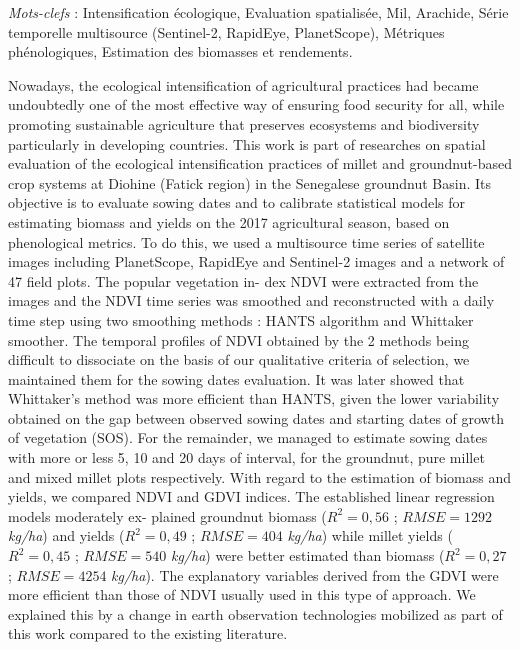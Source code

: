 \documentclass[a4paper,12pt,oneside,chapterprefix=false]{scrbook}
\newenvironment{abstract}%
{\cleardoublepage\thispagestyle{empty}\null\vfill\begin{center}%
\sffamily\bfseries \abstractname \end{center}}%
{\vfill\null}
\begin{document}
\begin{abstract}
    \vspace{8mm}
    
    \emph{Mots-clefs} : Intensification écologique, Evaluation spatialisée, Mil, Arachide, Série temporelle multisource (Sentinel-2, RapidEye, PlanetScope), Métriques phénologiques, Estimation des biomasses et rendements.

    \end {abstract}
    
    \begin {abstract}
    \thispagestyle{plain}
    
    \lettrine{N}owadays, the ecological intensification of agricultural practices had became undoubtedly one of the most effective way of ensuring food security for all, while promoting sustainable agriculture that preserves ecosystems and biodiversity particularly in developing countries. This work is part of researches on spatial evaluation of the ecological intensification practices of millet and groundnut-based crop systems at Diohine (Fatick region) in the Senegalese groundnut Basin. Its objective is to
    evaluate sowing dates and to calibrate statistical models for estimating biomass and
    yields on the 2017 agricultural season, based on phenological metrics. To do this, we
    used a multisource time series of satellite images including PlanetScope, RapidEye
    and Sentinel-2 images and a network of 47 field plots. The popular vegetation in-
    dex NDVI were extracted from the images and the NDVI time series was smoothed
    and reconstructed with a daily time step using two smoothing methods : HANTS
    algorithm and Whittaker smoother. The temporal profiles of NDVI obtained by the
    2 methods being difficult to dissociate on the basis of our qualitative criteria of selection, we maintained them for the sowing dates evaluation. It was later showed
    that Whittaker’s method was more efficient than HANTS, given the lower variability
    obtained on the gap between observed sowing dates and starting dates of growth of
    vegetation (SOS). For the remainder, we managed to estimate sowing dates with more
    or less 5, 10 and 20 days of interval, for the groundnut, pure millet and mixed millet
    plots respectively. With regard to the estimation of biomass and yields, we compared
    NDVI and GDVI indices. The established linear regression models moderately ex-
    plained groundnut biomass ($R^{2} = 0,56$ ; $RMSE = 1292$ \emph{kg/ha}) and yields ($R^{2} = 0,49$ ; $RMSE = 404$ \emph{kg/ha}) while millet yields ($R^{2} = 0,45$ ; $RMSE = 540$ \emph{kg/ha}) were better estimated than biomass ($R^{2} = 0,27$ ; $RMSE = 4254$ \emph{kg/ha}). The explanatory variables derived from the GDVI were more efficient than those of NDVI usually used in this type of approach. We explained this by a change in earth observation technologies mobilized as part of this work compared to the existing literature.
    

\end{abstract}
\end{document}
